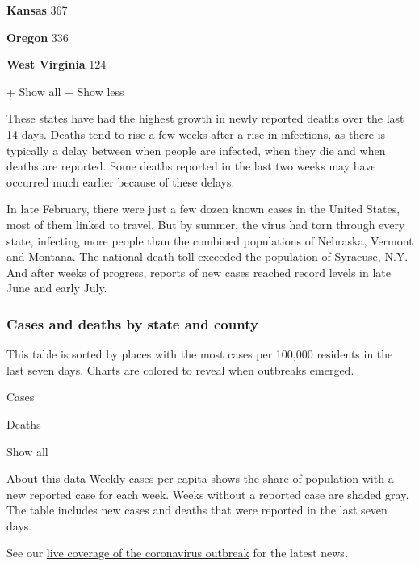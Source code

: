 \href{https://www.nytimes3xbfgragh.onion/interactive/2020/us/kansas-coronavirus-cases.html}{}

\textbf{Kansas} 367

\href{https://www.nytimes3xbfgragh.onion/interactive/2020/us/oregon-coronavirus-cases.html}{}

\textbf{Oregon} 336

\href{https://www.nytimes3xbfgragh.onion/interactive/2020/us/west-virginia-coronavirus-cases.html}{}

\textbf{West Virginia} 124

+ Show all + Show less

These states have had the highest growth in newly reported deaths over
the last 14 days. Deaths tend to rise a few weeks after a rise in
infections, as there is typically a delay between when people are
infected, when they die and when deaths are reported. Some deaths
reported in the last two weeks may have occurred much earlier because of
these delays.

In late February, there were just a few dozen known cases in the United
States, most of them linked to travel. But by summer, the virus had torn
through every state, infecting more people than the combined populations
of Nebraska, Vermont and Montana. The national death toll exceeded the
population of Syracuse, N.Y. And after weeks of progress, reports of new
cases reached record levels in late June and early July.

\hypertarget{cases-and-deaths-by-state-and-county}{%
\subsubsection{Cases and deaths by state and
county}\label{cases-and-deaths-by-state-and-county}}

This table is sorted by places with the most cases per 100,000 residents
in the last seven days. Charts are colored to reveal when outbreaks
emerged.

Cases

Deaths

Show all

About this data Weekly cases per capita shows the share of population
with a new reported case for each week. Weeks without a reported case
are shaded gray. The table includes new cases and deaths that were
reported in the last seven days.

See our
\href{https://www.nytimes3xbfgragh.onion/2020/08/04/world/coronavirus-covid-19.html}{live
coverage of the coronavirus outbreak} for the latest news.

